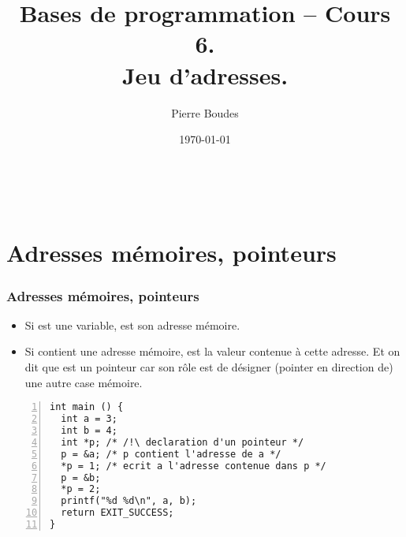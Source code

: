 \documentclass[xcolor=pdftex,svgnames,table]{beamer}
\title{Bases de programmation -- Cours 6.\\ Jeu d'adresses.}
\author{Pierre Boudes}
\date{\today}
\begin{document}
\begin{frame}
        \titlepage
        \vfill
        \begin{center}
                \\[2.5ex]
                {\tiny\CcNote{\CcLongnameByNcSa}}
                \vspace*{-2.5ex}
        \end{center}
\end{frame}

\section[Plan]{}
\frame[label=plan]{\tableofcontents}

\section{Adresses mémoires, pointeurs}

\begin{frame}[fragile]
  \frametitle{Adresses mémoires, pointeurs}


  \begin{itemize}
  \item  Si  est une variable,  est son adresse mémoire.
  \item  Si  contient une adresse mémoire,  est la valeur contenue
    à cette adresse. Et on dit que  est un \alert{pointeur} car son rôle
    est de désigner (pointer en direction de) une autre case mémoire.
  \end{itemize}
\begin{lstlisting}[numbers=left,basicstyle=\ttfamily\small]
int main () {
  int a = 3;
  int b = 4;
  int *p; /* /!\ declaration d'un pointeur */
  p = &a; /* p contient l'adresse de a */
  *p = 1; /* ecrit a l'adresse contenue dans p */
  p = &b;
  *p = 2;
  printf("%d %d\n", a, b);
  return EXIT_SUCCESS;
}
\end{lstlisting}
\end{frame}
\end{document}
